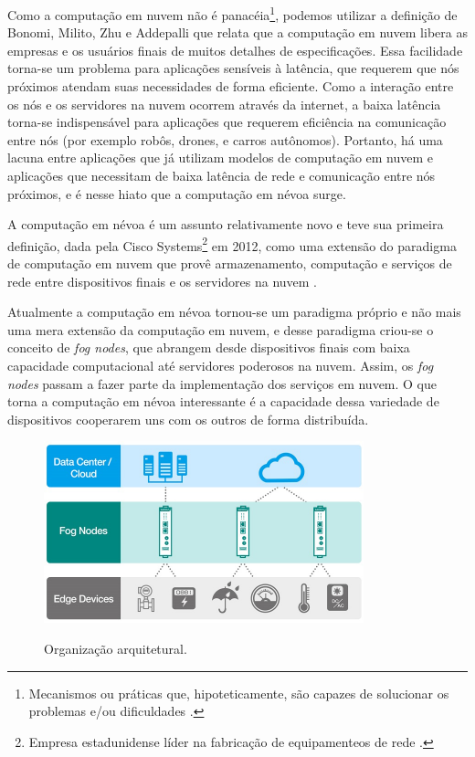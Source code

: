 Como a computação em nuvem não é panacéia\footnote{Mecanismos ou práticas que, hipoteticamente, são capazes de solucionar os problemas e/ou dificuldades \cite{definition:panaceia}.}, podemos utilizar a definição de Bonomi, Milito, Zhu e Addepalli \cite{Bonomi:2012} que relata que a computação em nuvem libera as empresas e os usuários finais de muitos detalhes de especificações.
Essa facilidade torna-se um problema para aplicações sensíveis à latência, que requerem que nós próximos atendam suas necessidades de forma eficiente. 
Como a interação entre os nós e os servidores na nuvem ocorrem através da internet, a baixa latência torna-se indispensável para aplicações que requerem eficiência na comunicação entre nós (por exemplo robôs, drones, e carros autônomos).
Portanto, há uma lacuna entre aplicações que já utilizam modelos de computação em nuvem e aplicações que necessitam de baixa latência de rede e comunicação entre nós próximos, e é nesse hiato que a computação em névoa surge.

A computação em névoa é um assunto relativamente novo e teve sua primeira definição, dada pela Cisco Systems\footnote{Empresa estadunidense líder na fabricação de equipamenteos de rede \cite{ciscoSystems}.} em 2012, como uma extensão do paradigma de computação em nuvem que provê armazenamento, computação e serviços de rede entre dispositivos finais e os servidores na nuvem \cite{DBLP:journals/corr/RomanLM16}. 

Atualmente a computação em névoa tornou-se um paradigma próprio e não mais uma mera extensão da computação em nuvem, e desse
paradigma criou-se o conceito de \textit{fog nodes}, que abrangem desde dispositivos finais com baixa capacidade computacional até servidores poderosos na nuvem.
Assim, os \textit{fog nodes} passam a fazer parte da implementação dos serviços em nuvem.
O que torna a computação em névoa interessante é a capacidade dessa variedade de dispositivos cooperarem uns com os outros de forma distribuída.

\begin{figure}[htb!]
    \centering\includegraphics[width=.5\textwidth]{fig1.pdf}
    \caption
    {\label{fig:fig1} Organização arquitetural.} \cite{archfog:2017}
\end{figure}

